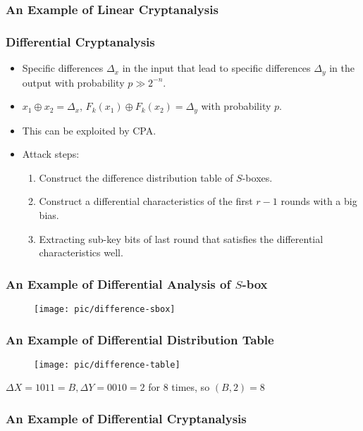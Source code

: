 \begin{frame}\frametitle{An Example of Linear Cryptanalysis}
\begin{figure}
\begin{center}

\end{center}
\end{figure}
\end{frame}
\begin{frame}\frametitle{Differential Cryptanalysis}
\begin{itemize}
\item Specific differences $\Delta_x$ in the input that lead to specific differences $\Delta_y$ in the output with probability $p \gg 2^{-n}$.
\item $x_1\oplus x_2=\Delta_x$, $F_k(x_1) \oplus F_k(x_2)=\Delta_y$ with probability $p$.
\item This can be exploited by CPA.
\item Attack steps:
\begin{enumerate}
\item Construct the difference distribution table of $S$-boxes.
\item Construct a differential characteristics of the first $r-1$ rounds with a big bias.
\item Extracting sub-key bits of last round that satisfies the differential characteristics well.
\end{enumerate}
\end{itemize}
\end{frame}
\begin{frame}\frametitle{An Example of Differential Analysis of $S$-box}
\begin{figure}
\begin{center}
\texttt{[image: pic/difference-sbox]} 
\end{center}
\end{figure}
\end{frame}
\begin{frame}\frametitle{An Example of Differential Distribution Table}
\begin{figure}
\begin{center}
\texttt{[image: pic/difference-table]} 
\end{center}
\end{figure}
$\Delta X = 1011 = B, \Delta Y = 0010 = 2$ for 8 times, so $(B, 2) = 8$
\end{frame}
\begin{frame}\frametitle{An Example of Differential Cryptanalysis}
\begin{figure}
\begin{center}

\end{center}
\end{figure}
\end{frame}
